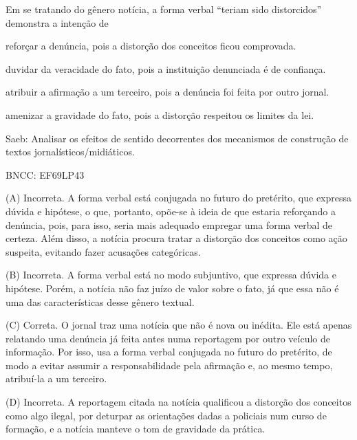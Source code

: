 
Em se tratando do gênero notícia, a forma verbal ``teriam sido
distorcidos'' demonstra a intenção de

\begin{escolha}
\item reforçar a denúncia, pois a distorção dos conceitos ficou comprovada.

\item duvidar da veracidade do fato, pois a instituição denunciada é de
confiança.

\item atribuir a afirmação a um terceiro, pois a denúncia foi feita por
outro jornal.

\item amenizar a gravidade do fato, pois a distorção respeitou os limites
da lei.
\end{escolha}

Saeb: Analisar os efeitos de sentido decorrentes dos mecanismos de
construção de textos jornalísticos/midiáticos.

BNCC: EF69LP43

(A) Incorreta. A forma verbal está conjugada no futuro do pretérito, que
expressa dúvida e hipótese, o que, portanto, opõe-se à ideia de que
estaria reforçando a denúncia, pois, para isso, seria mais adequado
empregar uma forma verbal de certeza. Além disso, a notícia procura
tratar a distorção dos conceitos como ação suspeita, evitando fazer
acusações categóricas.

(B) Incorreta. A forma verbal está no modo subjuntivo, que expressa
dúvida e hipótese. Porém, a notícia não faz juízo de valor sobre o fato,
já que essa não é uma das características desse gênero textual.

(C) Correta. O jornal traz uma notícia que não é nova ou inédita. Ele
está apenas relatando uma denúncia já feita antes numa reportagem por
outro veículo de informação. Por isso, usa a forma verbal conjugada no
futuro do pretérito, de modo a evitar assumir a responsabilidade pela
afirmação e, ao mesmo tempo, atribuí-la a um terceiro.

(D) Incorreta. A reportagem citada na notícia qualificou a distorção dos
conceitos como algo ilegal, por deturpar as orientações dadas a
policiais num curso de formação, e a notícia manteve o tom de gravidade
da prática.

